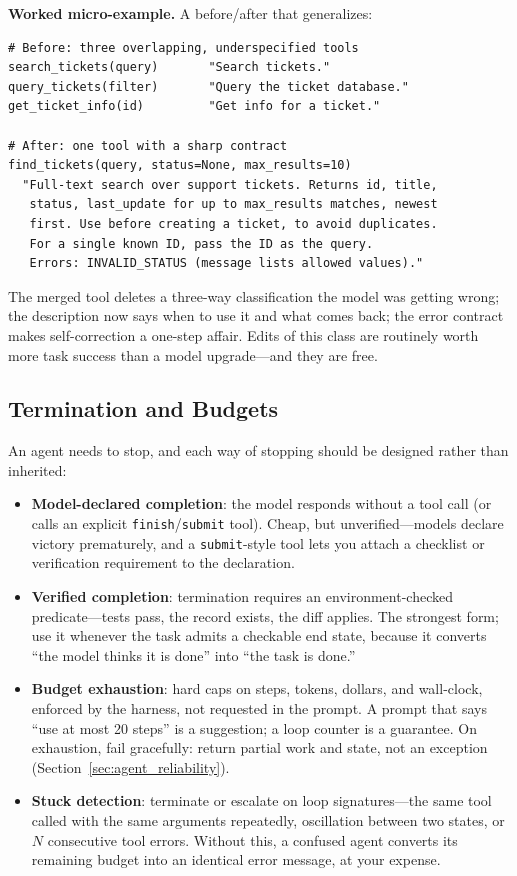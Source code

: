 \textbf{Worked micro-example.} A before/after that generalizes:

\begin{lstlisting}
# Before: three overlapping, underspecified tools
search_tickets(query)       "Search tickets."
query_tickets(filter)       "Query the ticket database."
get_ticket_info(id)         "Get info for a ticket."

# After: one tool with a sharp contract
find_tickets(query, status=None, max_results=10)
  "Full-text search over support tickets. Returns id, title,
   status, last_update for up to max_results matches, newest
   first. Use before creating a ticket, to avoid duplicates.
   For a single known ID, pass the ID as the query.
   Errors: INVALID_STATUS (message lists allowed values)."
\end{lstlisting}

The merged tool deletes a three-way classification the model was getting wrong; the description now says when to use it and what comes back; the error contract makes self-correction a one-step affair. Edits of this class are routinely worth more task success than a model upgrade---and they are free.

\subsection{Termination and Budgets}

An agent needs to stop, and each way of stopping should be designed rather than inherited:

\begin{itemize}
    \item \textbf{Model-declared completion}: the model responds without a tool call (or calls an explicit \texttt{finish}/\texttt{submit} tool). Cheap, but unverified---models declare victory prematurely, and a \texttt{submit}-style tool lets you attach a checklist or verification requirement to the declaration.
    \item \textbf{Verified completion}: termination requires an environment-checked predicate---tests pass, the record exists, the diff applies. The strongest form; use it whenever the task admits a checkable end state, because it converts ``the model thinks it is done'' into ``the task is done.''
    \item \textbf{Budget exhaustion}: hard caps on steps, tokens, dollars, and wall-clock, enforced by the harness, not requested in the prompt. A prompt that says ``use at most 20 steps'' is a suggestion; a loop counter is a guarantee. On exhaustion, fail gracefully: return partial work and state, not an exception (Section~\ref{sec:agent_reliability}).
    \item \textbf{Stuck detection}: terminate or escalate on loop signatures---the same tool called with the same arguments repeatedly, oscillation between two states, or $N$ consecutive tool errors. Without this, a confused agent converts its remaining budget into an identical error message, at your expense.
\end{itemize}

